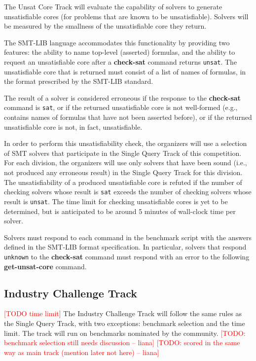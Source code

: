 \documentclass[12pt]{article}
\newcommand{\akey}[1]{\textbf{#1}}
\newcommand{\rem}[1]{\textcolor{red}{[#1]}}
\newcommand{\todo}[1]{\rem{TODO #1}}
\newcommand{\lh}[1]{\rem{#1 -- liana}}
\newcommand{\main}{Single Query\xspace}
\newcommand{\ucore}{Unsat Core\xspace}
\newcommand{\challenge}{Industry Challenge\xspace}
\begin{document}
The \ucore Track will evaluate the capability of solvers to
generate unsatisfiable cores (for problems that are known to be
unsatisfiable).  Solvers will be measured by the smallness of the
unsatisfiable core they return.

The SMT-LIB language accommodates this functionality by providing two
features: the ability to name top-level (asserted) formulas, and the
ability to request an unsatisfiable core after a \akey{check-sat}
command returns \texttt{unsat}.  The unsatisfiable core that is
returned must consist of a list of names of formulas, in the format
prescribed by the SMT-LIB standard.

The result of a solver is considered erroneous if the response to the
\akey{check-sat} command is \texttt{sat}, or if the returned
unsatisfiable core is not well-formed (e.g., contains names of
formulas that have not been asserted before), or if the returned
unsatisfiable core is not, in fact, unsatisfiable.

In order to perform this unsatisfiability check, the organizers will use a
selection of SMT solvers that participate in the \main Track of this
competition.  For each division, the organizers will use only solvers that have
been sound (i.e., not produced any erroneous result) in the \main Track for
this division.  The unsatisfiability of a produced unsatisfiable core is
refuted if the number of checking solvers whose result is \texttt{sat} exceeds
the number of checking solvers whose result is \texttt{unsat}.  The time limit
for checking unsatisfiable cores is yet to be determined, but is anticipated to
be around 5 minutes of wall-clock time per solver.

Solvers must respond to each command in the benchmark script with the
answers defined in the SMT-LIB format specification.  In particular,
solvers that respond \texttt{unknown} to the \akey{check-sat} command
must respond with an error to the following \akey{get-unsat-core}
command.

\subsection{\challenge Track}
\label{sec:exec:industry-challenge}

\todo{time limit}
The \challenge Track will follow the same rules as the \main Track,
with two exceptions: benchmark selection and the time limit. The track will run on benchmarks nominated by the community.
\lh{TODO: benchmark selection still needs discussion}
\lh{TODO: scored in the same way as main track (mention later not here)}
\end{document}
